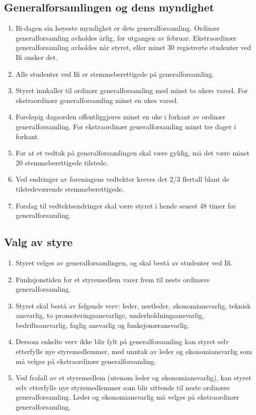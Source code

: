 \documentclass[norsk,a4paper]{article}
\begin{document}
\subsection{Generalforsamlingen og dens myndighet}
\begin{enumerate}
    \item{Ifi-dagen sin høyeste myndighet er dets generalforsamling. Ordinær generalforsamling avholdes årlig, før utgangen av februar. Ekstraordinær generalforsamling avholdes når styret, eller minst 30 registrerte studenter ved Ifi ønsker det.}
    \item{Alle studenter ved Ifi er stemmeberettigede på generalforsamling.}
    \item{Styret innkaller til ordinær generalforsamling med minst to ukers varsel. For ekstraordinær generalforsamling minst en ukes varsel.}
    \item{Foreløpig dagsorden offentliggjøres minst en uke i forkant av ordinær generalforsamling. For ekstraordinær generalforsamling minst tre dager i forkant.}
    \item{For at et vedtak på generalforsamlingen skal være gyldig, må det være minst 20 stemmeberettigede tilstede.}
    \item{Ved endringer av foreningens vedtekter kreves det 2/3 flertall blant de tilstedeværende stemmeberettigede.}
    \item{Forslag til vedtektsendringer skal være styret i hende senest 48 timer før generalforsamling.}
\end{enumerate}
\subsection{Valg av styre}
\begin{enumerate}
    \item{Styret velges av generalforsamlingen, og skal bestå av studenter ved Ifi.}
    \item{Funksjonstiden for et styremedlem varer frem til neste ordinære generalforsamling.}
    \item{Styret skal bestå av følgende verv: leder, nestleder, økonomiansvarlig, teknisk ansvarlig, to promoteringsansvarlige, underholdningsansvarlig, bedriftsansvarlig, faglig ansvarlig og funksjonæransvarlig.}
    \item{Dersom enkelte verv ikke blir fylt på generalforsamling kan styret selv etterfylle nye styremedlemmer, med unntak av leder og økonomiansvarlig som må velges på ekstraordinær generalforsamling.}
    \item{Ved frafall av et styremedlem (utenom leder og økonomiansvarlig), kan styret selv etterfylle nye styremedlemmer som blir sittende til neste ordinære generalforsamling. Leder og økonomiansvarlig må velges på ekstraordinær generalforsamling.}
\end{enumerate}
\end{document}
